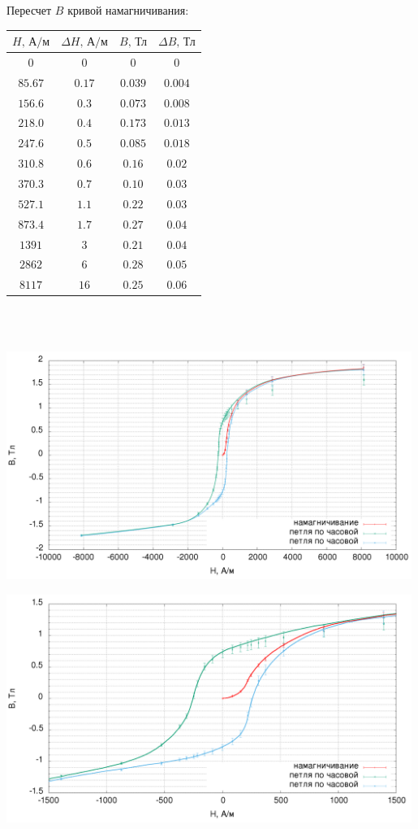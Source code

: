 Пересчет $B$ кривой намагничивания:
\begin{center}
\begin{tabular}{|c|c|c|c|}\hline
$H\text{, А/м}$&$\Delta H\text{, А/м}$&$B\text{, Тл}$&$\Delta B\text{, Тл}$\\\hline
$0$&$0$&$0$&$0$\\\hline
$85.67$&$0.17$&$0.039$&$0.004$\\\hline
$156.6$&$0.3$&$0.073$&$0.008$\\\hline
$218.0$&$0.4$&$0.173$&$0.013$\\\hline
$247.6$&$0.5$&$0.085$&$0.018$\\\hline
$310.8$&$0.6$&$0.16$&$0.02$\\\hline
$370.3$&$0.7$&$0.10$&$0.03$\\\hline
$527.1$&$1.1$&$0.22$&$0.03$\\\hline
$873.4$&$1.7$&$0.27$&$0.04$\\\hline
$1391$&$3$&$0.21$&$0.04$\\\hline
$2862$&$6$&$0.28$&$0.05$\\\hline
$8117$&$16$&$0.25$&$0.06$\\\hline
\end{tabular}\\~\\
\end{center}

\begin{center}
\includegraphics[width=0.99\textwidth]{5_big.png}
\end{center}
\begin{center}
\includegraphics[width=0.99\textwidth]{5_small.png}
\end{center}

